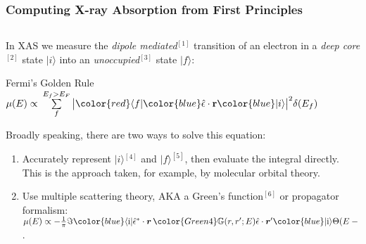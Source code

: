 \begin{frame}
  \frametitle{Computing X-ray Absorption from First Principles}
  \begin{columns}
    \begin{column}{0.75\linewidth}
      In XAS we measure the \emph{dipole mediated}$^\mathrm{[1]}$ transition of
      an electron in a \emph{deep core}$^\mathrm{[2]}$ state
      {\color{blue}$|i\rangle$} into an \emph{unoccupied}$^\mathrm{[3]}$ state
      {\color{red}$|f\rangle$}:


      \begin{block}{Fermi's Golden Rule}
        \centering
        $\mu(E) \propto\> \sum\limits_f^{E_f>E_F}
        \big|{\color{red}\langle f|}
        {\color{blue}\hat{\epsilon}\cdot\mathbf{r}}
        {\color{blue}|i\rangle}\big|^2
        \delta(E_f)$
      \end{block}

      Broadly speaking, there are two ways to solve this equation:
      \begin{enumerate}
      \item Accurately represent {\color{blue}$|i\rangle$}$^\mathrm{[4]}$  and
        {\color{red}$|f\rangle$}$^\mathrm{[5]}$, then evaluate
        the integral directly. This is the approach taken, for example, by
        molecular orbital theory.
      \item Use multiple scattering theory, AKA a Green's
        function$^\mathrm{[6]}$ or propagator formalism:\\
        {\footnotesize
        $\mu(E) \propto
        -\frac{1}{\pi} \Im {\color{blue}\langle \mathrm{i}
          |} \hat{\epsilon}^\ast \cdot \boldsymbol{r} \,
        {\color{Green4}\mathbb{G}(r,r';E)} \hat{\epsilon} \cdot \boldsymbol{r}' {\color{blue}|
          \mathrm{i} \rangle}
        \Theta(E-E_F)$.}
      \end{enumerate}      
    \end{column}
  \end{columns}
\end{frame}

